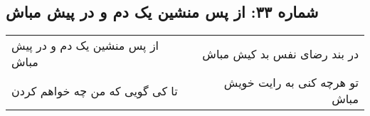 \begin{center}
\section*{شماره ۳۳: از پس منشین یک دم و در پیش مباش}
\label{sec:033}
\begin{longtable}{l p{0.5cm} r}
از پس منشین یک دم و در پیش مباش
&&
در بند رضای نفس بد کیش مباش
\\
تا کی گویی که من چه خواهم کردن
&&
تو هرچه کنی به رایت خویش مباش
\\
\end{longtable}
\end{center}
